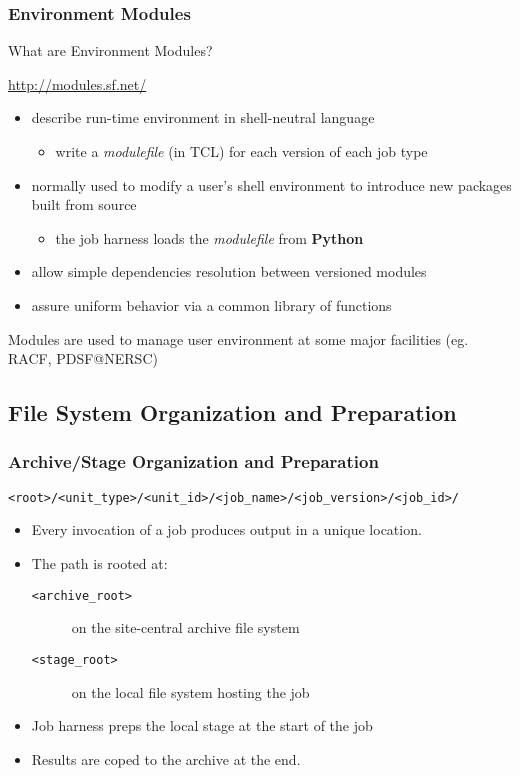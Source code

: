 \documentclass[xcolor=dvipsnames]{beamer}
\newcommand{\code}[1]{\texttt{#1}}
\begin{document}
\begin{frame}
  \frametitle{Environment Modules}

  What are Environment Modules?

  \begin{center}
    \url{http://modules.sf.net/}
  \end{center}
    
  \begin{itemize}
  \item describe run-time environment in shell-neutral language
    \begin{itemize}
    \item write a \textit{modulefile} (in TCL) for each version of each job type
    \end{itemize}
  \item normally used to modify a user's shell environment to
    introduce new packages built from source
    \begin{itemize}
    \item the job harness loads the \textit{modulefile} from \textbf{Python}
    \end{itemize}
  \item allow simple dependencies resolution between versioned modules
  \item assure uniform behavior via a common library of functions
  \end{itemize}

  Modules are used to manage user environment at some major facilities
  (eg. RACF, PDSF@NERSC)

\end{frame}

\subsection{File System Organization and Preparation}

\begin{frame}
  \frametitle{Archive/Stage Organization and Preparation}
  {\footnotesize
    \begin{center}
      \code{<root>/<unit\_type>/<unit\_id>/<job\_name>/<job\_version>/<job\_id>/}
    \end{center}}
  \begin{itemize}
  \item Every invocation of a job produces output in a unique location.
  \item The path is rooted at:
    \begin{description}
    \item[\code{<archive\_root>}] on the site-central archive file system
    \item[\code{<stage\_root>}] on the local file system hosting the job
    \end{description}
  \item Job harness preps the local stage at the start of the job
  \item Results are coped to the archive at the end.
  \end{itemize}

\end{frame}
\end{document}
